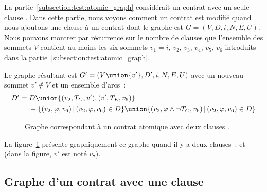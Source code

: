La partie~\ref{subsection:test:atomic_graph} considérait un contrat avec un
seule clause \athrowable. Dans cette partie, nous voyons comment un contrat est
modifié quand nous ajoutons une clause  à un
contrat dont le graphe est $G = (V, D, i, N, E, U)$. Nous pouvons montrer par
récurrence sur le nombre de clauses \athrowable que l'ensemble des sommets $V$
contient au moins les six sommets $v_1 = i$, $v_2$, $v_3$, $v_4$, $v_5$, $v_6$
introduits dans la partie~\ref{subsection:test:atomic_graph}.

Le graphe résultant est $G' = (V \union \{v'\}, D', i, N, E, U)$ avec un nouveau
sommet $v' \notin V$ et un ensemble d'arcs~:
%
\begin{equation*}
\centering
\begin{aligned}
D' =\; & D \union \{(v_2, T_C, v'), (v', T_E, v_5)\} \\
     & - \{(v_2, \varphi, v_6) \,\vert\, (v_2, \varphi, v_6) \in D\} \union
       \{(v_2, \varphi \land \neg T_C, v_6) \,\vert\, (v_2, \varphi, v_6) \in D\}
\end{aligned}
\end{equation*}

\begin{figure}


\caption{\label{figure:test:throwable_graph} Graphe correspondant à un contrat
atomique avec deux clauses \athrowable.}

\end{figure}

\begin{example}

La figure~\ref{figure:test:throwable_graph} présente graphiquement ce graphe
quand il y a deux clauses~:  et
 (dans la figure, $v'$ est noté
$v_7$).

\end{example}

\subsection{Graphe d'un contrat avec une clause \abehavior}
\label{subsection:test:behavior_graph}

